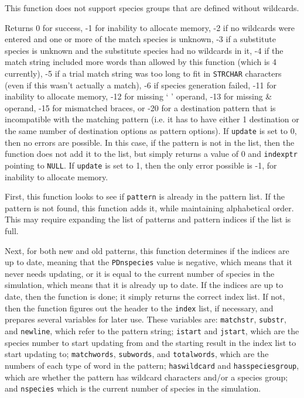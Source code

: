 \documentclass {scrbook}
\newcommand {\ttt} {\texttt}
\begin{document}
\begin{description}
This function does not support species groups that are defined without wildcards.

Returns 0 for success, -1 for inability to allocate memory, -2 if no wildcards were entered and one or more of the match species is unknown, -3 if a substitute species is unknown and the substitute species had no wildcards in it, -4 if the match string included more words than allowed by this function (which is 4 currently), -5 if a trial match string was too long to fit in \ttt{STRCHAR} characters (even if this wasn't actually a match), -6 if species generation failed, -11 for inability to allocate memory, -12 for missing ` ' operand, -13 for missing \& operand, -15 for mismatched braces, or -20 for a destination pattern that is incompatible with the matching pattern (i.e. it has to have either 1 destination or the same number of destination options as pattern options). If \ttt{update} is set to 0, then no errors are possible. In this case, if the pattern is not in the list, then the function does not add it to the list, but simply returns a value of 0 and \ttt{indexptr} pointing to \ttt{NULL}. If \ttt{update} is set to 1, then the only error possible is -1, for inability to allocate memory.

First, this function looks to see if \ttt{pattern} is already in the pattern list. If the pattern is not found, this function adds it, while maintaining alphabetical order. This may require expanding the list of patterns and pattern indices if the list is full.

Next, for both new and old patterns, this function determines if the indices are up to date, meaning that the \ttt{PDnspecies} value is negative, which means that it never needs updating, or it is equal to the current number of species in the simulation, which means that it is already up to date. If the indices are up to date, then the function is done; it simply returns the correct index list. If not, then the function figures out the header to the \ttt{index} list, if necessary, and prepares several variables for later use. These variables are: \ttt{matchstr}, \ttt{substr}, and \ttt{newline}, which refer to the pattern string; \ttt{istart} and \ttt{jstart}, which are the species number to start updating from and the starting result in the index list to start updating to; \ttt{matchwords}, \ttt{subwords}, and \ttt{totalwords}, which are the numbers of each type of word in the pattern; \ttt{haswildcard} and \ttt{hasspeciesgroup}, which are whether the pattern has wildcard characters and/or a species group; and \ttt{nspecies} which is the current number of species in the simulation.


\end{description}
\end{document}
